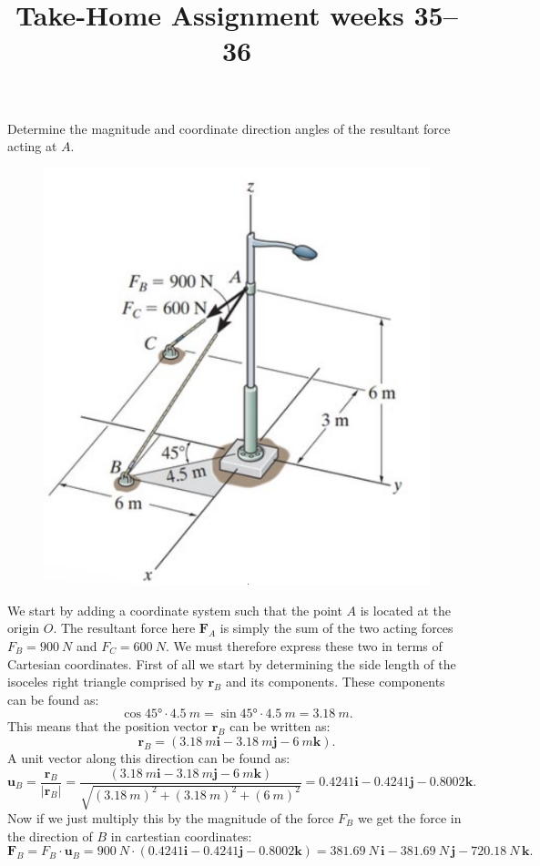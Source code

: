 \documentclass[a4paper]{article}
\title{Take-Home Assignment weeks 35--36}
\date{}
\begin{document}
\maketitle

Determine the magnitude and coordinate direction angles of the resultant force acting at $A$.

\begin{figure} [ht]
  \centering
  \includegraphics[width=0.35\linewidth]{../figures/P1_1}
\end{figure}

We start by adding a coordinate system such that the point $A$ is located at the origin $O$. The resultant force here $\textbf{F}_A$ is simply the sum of the two acting forces $F_B = \qty{900}{N}$ and $F_C = \qty{600}{N}$. We must therefore express these two in terms of Cartesian coordinates. First of all we start by determining the side length of the isoceles right triangle comprised by $\textbf{r}_B$ and its components. These components can be found as:
\[ 
  \cos \ang{45} \cdot \qty{4.5}{m} = \sin \ang{45} \cdot \qty{4.5}{m} = \qty{3,18}{m}
.\]
This means that the position vector $\textbf{r}_B$ can be written as:
\[ 
\textbf{r}_B = \left( \qty{3,18}{m} \textbf{i} - \qty{3,18}{m} \textbf{j} - \qty{6}{m} \textbf{k} \right)
.\]
A unit vector along this direction can be found as:
\[ 
\textbf{u}_B = \frac{\textbf{r}_B}{\left| \textbf{r}_B \right|} = \frac{ \left( \qty{3,18}{m} \textbf{i} - \qty{3,18}{m} \textbf{j} - \qty{6}{m} \textbf{k} \right)}{\sqrt{ \left( \qty{3,18}{m}  \right)^2 + \left( \qty{3,18}{m}  \right)^2 + \left( \qty{6}{m}  \right)^2 }} = \num{0,4241}  \textbf{i} - \num{0,4241}  \textbf{j} - \num{0,8002} \textbf{k}
.\]
Now if we just multiply this by the magnitude of the force $F_B$ we get the force in the direction of $B$ in cartestian coordinates:
\[ 
\textbf{F}_B = F_B \cdot \textbf{u}_B = \qty{900}{N} \cdot \left( \num{0,4241} \textbf{i} - \num{0,4241} \textbf{j} - \num{0,8002} \textbf{k}  \right) = \qty{381,69}{N} \, \textbf{i} - \qty{381,69}{N} \, \textbf{j} - \qty{720,18}{N} \, \textbf{k}
.\]
\end{document}
